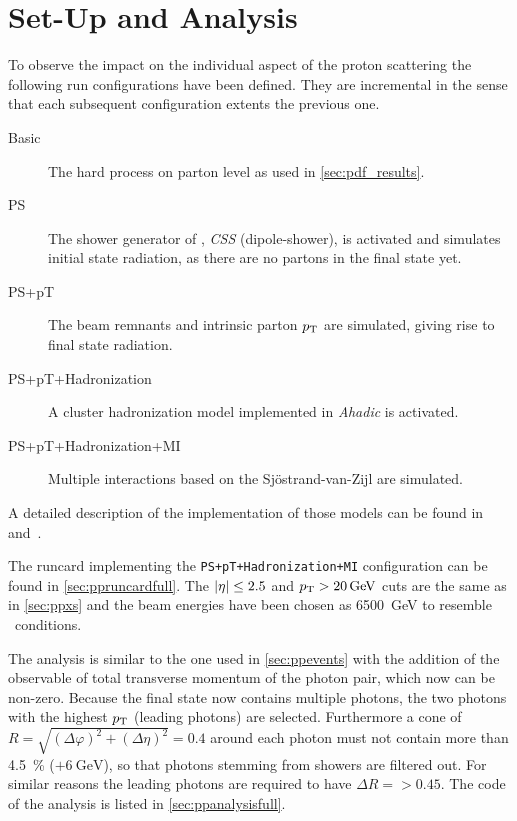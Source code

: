 \section{Set-Up and Analysis}%
\label{sec:setupan}

To observe the impact on the individual aspect of the proton
scattering the following run configurations have been defined. They
are incremental in the sense that each subsequent configuration
extents the previous one.

\begin{description}
\item[Basic] The hard process on parton level as used in \cref{sec:pdf_results}.
\item[PS] The shower generator of \sherpa, \emph{CSS} (dipole-shower),
  is activated and simulates initial state radiation, as there are no
  partons in the final state yet.
\item[PS+pT] The beam remnants and intrinsic parton
  \(p_\mathrm{T}\) are simulated, giving rise to final state radiation.
\item[PS+pT+Hadronization] A cluster hadronization model
  implemented in \emph{Ahadic} is activated.
\item[PS+pT+Hadronization+MI] Multiple interactions based on the
  Sj\"ostrand-van-Zijl are simulated.
\end{description}

A detailed description of the implementation of those models can be
found in~\cite{Gleisberg:2008ta} and~\cite{Bothmann:2019yzt}.

The runcard implementing the \texttt{PS+pT+Hadronization+MI}
configuration can be found in \cref{sec:ppruncardfull}. The
\(\abs{\eta}\leq 2.5\) and \(p_\mathrm{T} > \SI{20}{\giga\electronvolt}\) cuts are
the same as in \cref{sec:ppxs} and the beam energies have been chosen
as \SI{6500}{\giga\electronvolt} to resemble \lhc\ conditions.

The analysis is similar to the one used in \cref{sec:ppevents} with
the addition of the observable of total transverse momentum of the
photon pair, which now can be non-zero. Because the final state now
contains multiple photons, the two photons with the highest \(p_\mathrm{T}\)
(leading photons) are selected. Furthermore a cone of
\(R=\sqrt{(\Delta\varphi)^2 + (\Delta\eta)^2}=0.4\) around each photon
must not contain more than \SI{4.5}{\percent}
(\(+ \SI{6}{\giga\electronvolt}\)), so that photons stemming from
showers are filtered out. For similar reasons the leading photons are
required to have \(\Delta R = \gt 0.45\). The code of the analysis is
listed in \cref{sec:ppanalysisfull}.

